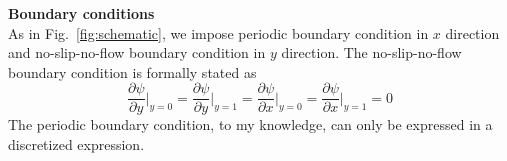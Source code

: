 \documentclass[onecolumn,aps, pre,amsmath,amssymb,longbibliography,11pt]{revtex4-2}
\begin{document}
\textbf{Boundary conditions} \\ [1em]

As in Fig.~\ref{fig:schematic}, we impose periodic boundary condition in $x$ direction and no-slip-no-flow boundary condition in $y$ direction. The no-slip-no-flow boundary condition is formally stated as
$$
\frac{\partial\psi}{\partial y}\Big|_{y=0}=\frac{\partial\psi}{\partial y}\Big|_{y=1}=\frac{\partial\psi}{\partial x}\Big|_{y=0}=\frac{\partial\psi}{\partial x}\Big|_{y=1}=0
$$
%
The periodic boundary condition, to my knowledge, can only be expressed in a discretized expression.
\end{document}
